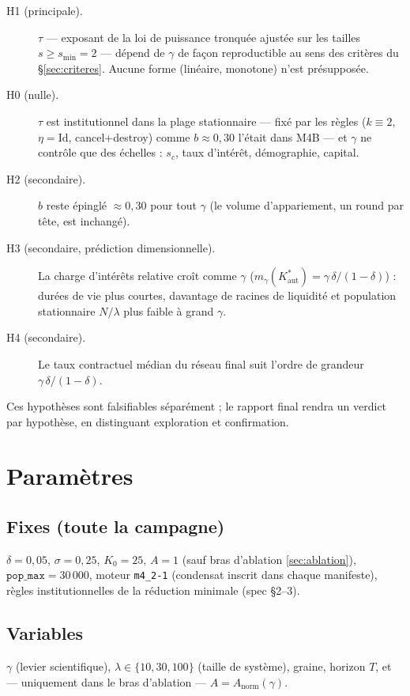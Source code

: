 \documentclass[11pt,a4paper]{article}
\newcommand{\code}[1]{\texttt{#1}}
\newcommand{\Kaut}{K^{*}_{\mathrm{aut}}}
\begin{document}
\begin{description}
\item[H1 (principale).] $\tau$ --- exposant de la loi de puissance
tronquée ajustée sur les tailles $s\ge s_{\min}=2$ --- dépend de $\gamma$
de façon reproductible au sens des critères du §\ref{sec:criteres}.
Aucune forme (linéaire, monotone) n'est présupposée.
\item[H0 (nulle).] $\tau$ est institutionnel dans la plage stationnaire
--- fixé par les règles ($k\equiv2$, $\eta=\mathrm{Id}$, cancel+destroy)
comme $b\approx0{,}30$ l'était dans M4B --- et $\gamma$ ne contrôle que
des échelles : $s_c$, taux d'intérêt, démographie, capital.
\item[H2 (secondaire).] $b$ reste épinglé $\approx0{,}30$ pour tout
$\gamma$ (le volume d'appariement, un round par tête, est inchangé).
\item[H3 (secondaire, prédiction dimensionnelle).] La charge d'intérêts
relative croît comme $\gamma$ ($m_\gamma(\Kaut)=\gamma\,\delta/(1-\delta)$) :
durées de vie plus courtes, davantage de racines de liquidité et population
stationnaire $N/\lambda$ plus faible à grand $\gamma$.
\item[H4 (secondaire).] Le taux contractuel médian du réseau final suit
l'ordre de grandeur $\gamma\,\delta/(1-\delta)$.
\end{description}

Ces hypothèses sont falsifiables séparément ; le rapport final rendra un
verdict par hypothèse, en distinguant exploration et confirmation.

\section{Paramètres}

\subsection{Fixes (toute la campagne)}

$\delta=0{,}05$, $\sigma=0{,}25$, $K_0=25$, $A=1$ (sauf bras d'ablation
\ref{sec:ablation}), $\code{pop\_max}=30\,000$, moteur \code{m4\_2-1}
(condensat inscrit dans chaque manifeste), règles institutionnelles de la
réduction minimale (spec §2--3).

\subsection{Variables}

$\gamma$ (levier scientifique), $\lambda\in\{10,30,100\}$ (taille de
système), graine, horizon $T$, et --- uniquement dans le bras d'ablation ---
$A=A_{\mathrm{norm}}(\gamma)$.
\end{document}
